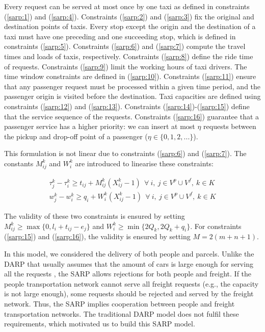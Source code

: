 \documentclass[preprint,authoryear,12pt]{elsarticle}
\begin{document}
Every request can be served at most once by one taxi as defined in constraints (\ref{sarp:1}) and (\ref{sarp:4}). Constraints (\ref{sarp:2}) and (\ref{sarp:3}) fix the original and destination points of taxis. Every stop except the origin and the destination of a taxi must have one preceding and one succeeding stop, which is defined in constraints (\ref{sarp:5}). Constraints (\ref{sarp:6}) and (\ref{sarp:7}) compute the travel times and loads of taxis, respectively. Constraints (\ref{sarp:8}) define the ride time of requests. Constraints  (\ref{sarp:9}) limit the working hours of taxi drivers. The time window constraints are defined in (\ref{sarp:10}). Constraints  (\ref{sarp:11}) ensure that any passenger request must be processed within a given time period, and the passenger origin is visited before the destination. Taxi capacities are defined using constraints (\ref{sarp:12}) and (\ref{sarp:13}). Constraints (\ref{sarp:14})-(\ref{sarp:15}) define that the service sequence of the requests.
Constraints (\ref{sarp:16}) guarantee that a passenger service has a higher priority: we can insert at most $\eta$ requests between the pickup and drop-off point of a passenger ($\eta \in \{0,1,2,...\}$). 

This formulation is not linear due to constraints (\ref{sarp:6}) and (\ref{sarp:7}). The constants $M_{ij}^{k}$ and $W_{i}^{k}$ are introduced to linearise these constraints:

\begin{eqnarray}
\tau_j^k -\tau_i^k\geq  t_{ij}+M_{ij}^{k}(X_{ij}^{k}-1)    ~~ \forall~i,~j\in V^p\cup V^f,~k\in K  \label{sarp:18}\\
w_j^k -w_i^k\geq q_{i}+W_{i}^{k}(X_{ij}^{k}-1)    ~~ \forall~i,~j\in V^p\cup V^f,~k\in K  \label{sarp:19}
\end{eqnarray}

The validity of these two constraints is ensured by setting $M_{ij}^{k}\geq \max \{0,l_i+t_{ij}-e_j\}$ and $W_{i}^{k} \geq \min\{2 Q_k,2 Q_k+q_i\}$. For constraints (\ref{sarp:15}) and (\ref{sarp:16}), the validity is ensured by setting $M=2(m+n+1)$.

In this model, we considered the delivery of both people and parcels. Unlike the DARP that usually assumes that the amount of cars is large enough for serving all the requests \citep[see, e.g., ][]{Cordeau}, the SARP allows rejections for both people and freight. If the people transportation network cannot serve all freight requests (e.g., the capacity is not large enough), some requests should be rejected and served by the freight network. Thus, the SARP implies cooperation between people and freight transportation networks. The traditional DARP model does not fulfil these requirements, which motivated us to build this SARP model.
\end{document}
